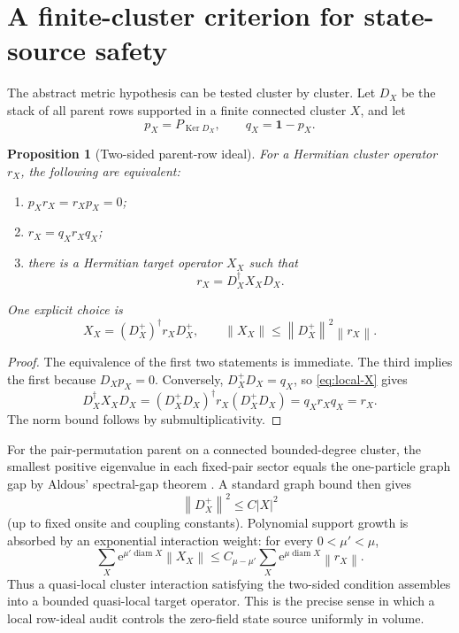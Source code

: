 \documentclass[11pt]{article}
\newtheorem{proposition}[theorem]{Proposition}
\theoremstyle{definition}
\theoremstyle{remark}
\newcommand{\Id}{\mathbf 1}
\newcommand{\Ker}{\operatorname{Ker}}
\newcommand{\e}{\mathrm e}
\newcommand{\norm}[1]{\left\lVert #1\right\rVert}
\newcommand{\abs}[1]{\left\lvert #1\right\rvert}
\begin{document}
\section{A finite-cluster criterion for state-source safety}
\label{sec:row-ideal}

The abstract metric hypothesis can be tested cluster by cluster.  Let $D_X$ be
the stack of all parent rows supported in a finite connected cluster $X$, and
let
\begin{equation}
 p_X=P_{\Ker D_X},
 \qquad q_X=\Id-p_X.
 \label{eq:local-pq}
\end{equation}

\begin{proposition}[Two-sided parent-row ideal]
\label{prop:row-ideal}
For a Hermitian cluster operator $r_X$, the following are equivalent:
\begin{enumerate}
\item $p_Xr_X=r_Xp_X=0$;
\item $r_X=q_Xr_Xq_X$;
\item there is a Hermitian target operator $X_X$ such that
\begin{equation}
 r_X=D_X^\dagger X_XD_X.
 \label{eq:local-factorization}
\end{equation}
\end{enumerate}
One explicit choice is
\begin{equation}
 X_X=(D_X^+)^\dagger r_XD_X^+,
 \qquad
 \norm{X_X}\le\norm{D_X^+}^2\norm{r_X}.
 \label{eq:local-X}
\end{equation}
\end{proposition}

\begin{proof}
The equivalence of the first two statements is immediate.  The third implies
the first because $D_Xp_X=0$.  Conversely,
$D_X^+D_X=q_X$, so \eqref{eq:local-X} gives
\begin{equation}
 D_X^\dagger X_XD_X
 =(D_X^+D_X)^\dagger r_X(D_X^+D_X)
 =q_Xr_Xq_X=r_X.
\end{equation}
The norm bound follows by submultiplicativity.
\end{proof}

For the pair-permutation parent on a connected bounded-degree cluster, the
smallest positive eigenvalue in each fixed-pair sector equals the one-particle
graph gap by Aldous' spectral-gap theorem \cite{Caputo2010}.  A standard graph
bound then gives
\begin{equation}
 \norm{D_X^+}^2\le C\abs X^2
 \label{eq:local-pseudoinverse}
\end{equation}
(up to fixed onsite and coupling constants).  Polynomial support growth is
absorbed by an exponential interaction weight: for every $0<\mu'<\mu$,
\begin{equation}
 \sum_X\e^{\mu'\operatorname{diam}X}\norm{X_X}
 \le C_{\mu-\mu'}
 \sum_X\e^{\mu\operatorname{diam}X}\norm{r_X}.
 \label{eq:locality-loss}
\end{equation}
Thus a quasi-local cluster interaction satisfying the two-sided condition
assembles into a bounded quasi-local target operator.  This is the precise
sense in which a local row-ideal audit controls the zero-field state source
uniformly in volume.
\end{document}

